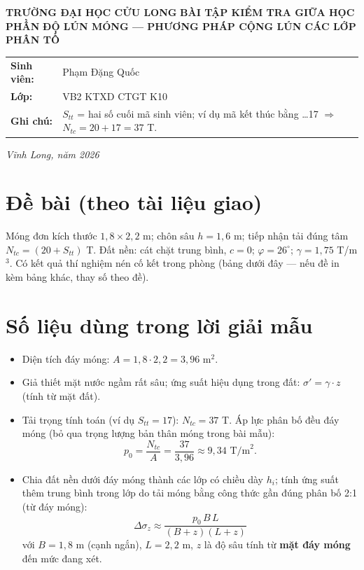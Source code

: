 \documentclass[12pt,a4paper]{article}
\begin{document}
\begin{titlepage}
    \centering
    \vspace*{1cm}
    {\fontsize{14}{17}\selectfont \textbf{TRƯỜNG ĐẠI HỌC CỬU LONG}}
    \vspace{2cm}
    {\fontsize{18}{21}\selectfont \textbf{\color{bkblue}BÀI TẬP KIỂM TRA GIỮA HỌC PHẦN}}
    \vspace{0.5cm}
    {\fontsize{16}{20}\selectfont \bfseries ĐỘ LÚN MÓNG --- PHƯƠNG PHÁP CỘNG LÚN CÁC LỚP PHÂN TỐ}
    \vspace{2cm}
    \begin{tabular}{l l}
        \textbf{Sinh viên:} & Phạm Đặng Quốc \\
        \textbf{Lớp:} & VB2 KTXD CTGT K10 \\
        \textbf{Ghi chú:} & $S_{tt}$ = hai số cuối mã sinh viên; ví dụ mã kết thúc bằng \ldots17 $\Rightarrow$ $N_{tc} = 20 + 17 = 37$ T. \\
    \end{tabular}
    \vfill
    {\fontsize{13}{16}\selectfont \textit{Vĩnh Long, năm 2026}}
\end{titlepage}

\newpage

\section{Đề bài (theo tài liệu giao)}
Móng đơn kích thước $1{,}8 \times 2{,}2$ m; chôn sâu $h = 1{,}6$ m; tiếp nhận tải đúng tâm $N_{tc} = (20 + S_{tt})$ T. Đất nền: cát chặt trung bình, $c = 0$; $\varphi = 26^\circ$; $\gamma = 1{,}75$ T/m$^3$. Có kết quả thí nghiệm nén cố kết trong phòng (bảng dưới đây --- nếu đề in kèm bảng khác, thay số theo đề).

\section{Số liệu dùng trong lời giải mẫu}
\begin{itemize}
    \item Diện tích đáy móng: $A = 1{,}8 \cdot 2{,}2 = 3{,}96$ m$^2$.
    \item Giả thiết mặt nước ngầm rất sâu; ứng suất hiệu dụng trong đất: $\sigma' = \gamma \cdot z$ (tính từ mặt đất).
    \item Tải trọng tính toán (ví dụ $S_{tt} = 17$): $N_{tc} = 37$ T. Áp lực phân bố đều đáy móng (bỏ qua trọng lượng bản thân móng trong bài mẫu):
    \[ p_0 = \frac{N_{tc}}{A} = \frac{37}{3{,}96} \approx 9{,}34 \text{ T/m}^2. \]
    \item Chia đất nền dưới đáy móng thành các lớp có chiều dày $h_i$; tính ứng suất thêm trung bình trong lớp do tải móng bằng công thức gần đúng phân bố 2:1 (từ đáy móng):
    \[ \Delta\sigma_z \approx \frac{p_0\, B\, L}{(B+z)(L+z)} \]
    với $B = 1{,}8$ m (cạnh ngắn), $L = 2{,}2$ m, $z$ là độ sâu tính từ \textbf{mặt đáy móng} đến mức đang xét.
\end{itemize}
\end{document}
